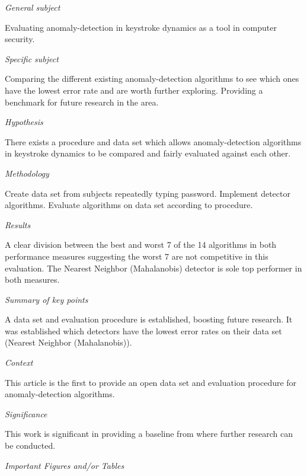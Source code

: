 \documentclass[11pt, a4paper]{article}
\begin{document}
\vspace{2mm}\noindent\textit{General subject}

Evaluating anomaly-detection in keystroke dynamics as a tool in computer security.  

\vspace{2mm}\noindent\textit{Specific subject}

Comparing the different existing anomaly-detection algorithms to see which ones have the lowest error rate
and are worth further exploring. Providing a benchmark for future research in the area.

\vspace{2mm}\noindent\textit{Hypothesis}

There exists a procedure and data set which allows anomaly-detection algorithms in keystroke dynamics to be
compared and fairly evaluated against each other. 

\vspace{2mm}\noindent\textit{Methodology}

Create data set from subjects repeatedly typing password.
Implement detector algorithms.
Evaluate algorithms on data set according to procedure. 

\vspace{2mm}\noindent\textit{Results}

A clear division between the best and worst 7 of the 14 algorithms in both performance measures suggesting
the worst 7 are not competitive in this evaluation.
The Nearest Neighbor (Mahalanobis) detector is sole top performer in both measures. 

\vspace{2mm}\noindent\textit{Summary of key points}

A data set and evaluation procedure is established, boosting future research.
It was established which detectors have the lowest error rates on their data set (Nearest Neighbor (Mahalanobis)).

\vspace{2mm}\noindent\textit{Context}

This article is the first to provide an open data set and evaluation procedure for
anomaly-detection algorithms. 

\vspace{2mm}\noindent\textit{Significance}

This work is significant in providing a baseline from where further research can be conducted.

\vspace{2mm}\noindent\textit{Important Figures and/or Tables}
\end{document}
